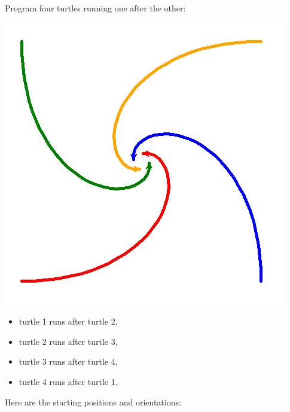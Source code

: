 \documentclass[11pt,class=report,crop=false]{standalone}
\begin{document}
\begin{activite}


Program four turtles running one after the other:

\begin{center}
\includegraphics[scale=\myscale,scale=0.5]{screen-turtle-6a}
\end{center}


\begin{itemize}
  \item turtle 1 runs after turtle 2,
  \item turtle 2 runs after turtle 3,
  \item turtle 3 runs after turtle 4,
  \item turtle 4 runs after turtle 1.
\end{itemize}

\bigskip

Here are the starting positions and orientations:



\end{activite}
\end{document}
